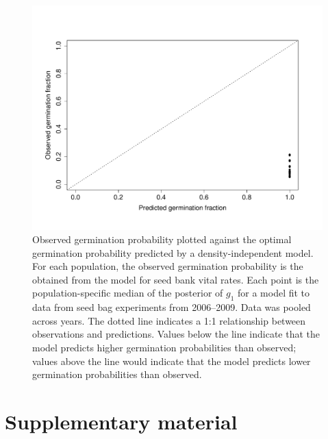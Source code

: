 \documentclass[12pt, oneside, titlepage]{article}   	%
\begin{document}
  \begin{figure}[h]
   \centering
       \includegraphics[page=1,width=.9\textwidth]{../figures/obs_pred_germ.pdf}  
    \caption{ Observed germination probability plotted against the optimal germination probability predicted by a density-independent model. For each population, the observed germination probability is the obtained from the model for seed bank vital rates. Each point is the population-specific median of the posterior of $g_1$ for a model fit to data from seed bag experiments from 2006--2009. Data was pooled across years. The dotted line indicates a 1:1 relationship between observations and predictions. Values below the line indicate that the model predicts higher germination probabilities than observed; values above the line would indicate that the model predicts lower germination probabilities than observed. }
 \label{fig:obs_pred}
\end{figure}

\clearpage
 


\clearpage
\section*{Supplementary material}
\end{document}
